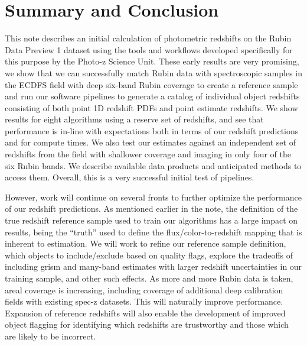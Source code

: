 \section{Summary and Conclusion}
\label{sec:summary:0}

This note describes an initial calculation of photometric redshifts on the Rubin Data Preview 1 dataset using the tools and workflows developed specifically for this purpose by the Photo-z Science Unit.  These early results are very promising, we show that we can successfully match Rubin data with spectroscopic samples in the ECDFS field with deep six-band Rubin coverage to create a reference sample and run our software pipelines to generate a catalog of individual object redshifts consisting of both point 1D redshift PDFs and point estimate redshifts.  We show results for eight \photoz algorithms using a reserve set of redshifts, and see that \photoz performance is in-line with expectations both in terms of our redshift predictions and for compute times.  We also test our estimates against an independent set of redshifts from the  field with shallower coverage and imaging in only four of the six Rubin bands.  We describe available data products and anticipated methods to access them.  Overall, this is a very successful initial test of \photoz pipelines.

However, work will continue on several fronts to further optimize the performance of our redshift predictions.  As mentioned earlier in the note, the definition of the true redshift reference sample used to train our algorithms has a large impact on results, being the ``truth'' used to define the flux/color-to-redshift mapping that is inherent to \photoz estimation.  We will work to refine our reference sample definition, which objects to include/exclude based on quality flags, explore the tradeoffs of including grism and many-band \photoz estimates with larger redshift uncertainties in our training sample, and other such effects.  As more and more Rubin data is taken, areal coverage is increasing, including coverage of additional deep calibration fields with existing spec-z datasets.  This will naturally improve \photoz performance.  Expansion of reference redshifts will also enable the development of improved object flagging for identifying which redshifts are trustworthy and those which are likely to be incorrect.

